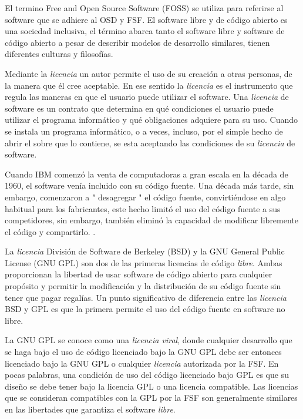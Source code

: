  	El termino Free and Open Source Software (FOSS) se utiliza para referirse al software que se adhiere al OSD y FSF. El software libre y de código
	abierto es una sociedad inclusiva, el término abarca tanto el software libre y software de código abierto a pesar de describir modelos de desarrollo
	similares, tienen diferentes culturas y filosofías.
	
	Mediante la \textit{licencia} un autor permite el uso de su creación a otras personas, de la manera que él cree aceptable. En ese sentido
	la \textit{licencia} es el instrumento que regula las maneras en que el usuario puede utilizar el software. Una \textit{licencia} de software es un
	contrato que determina en qué condiciones el usuario puede utilizar el programa informático y qué obligaciones adquiere para su uso. Cuando se
	instala un programa informático, o a veces, incluso, por el simple hecho de abrir el sobre que lo contiene, se esta aceptando las condiciones de su
	\textit{licencia} de software.
	
	Cuando IBM comenzó la venta de computadoras a gran escala en la década de 1960, el software venía incluido con su código fuente. Una década más
	tarde, sin embargo, comenzaron a " desagregar "  el código fuente, convirtiéndose en algo habitual para los fabricantes, este hecho limitó el uso del
	código fuente a sus competidores, sin embargo, también eliminó la capacidad de modificar libremente el código y compartirlo. \cite{Etiqueta08}.
	
	La \textit{licencia} División de Software de Berkeley (BSD) y la GNU General Public License (GNU GPL) son dos de las primeras licencias de código
	\textit{libre}. Ambas proporcionan la libertad de usar software de código abierto para cualquier propósito y permitir la modificación y la
	distribución de su código fuente sin tener que pagar regalías. Un punto significativo de diferencia entre las \textit{licencia} BSD y GPL es que la
	primera permite el uso del código fuente en software no libre.
	
	La GNU GPL se conoce como una \textit{licencia viral}, donde cualquier desarrollo que se haga bajo el uso de código licenciado bajo la GNU GPL debe
	ser entonces licenciado bajo la GNU GPL o cualquier \textit{licencia} autorizada por la FSF. En pocas palabras, una condición de uso del código
	licenciado bajo GPL es que su diseño se debe tener bajo la licencia  GPL o una licencia compatible. Las licencias que se consideran compatibles con
	la GPL por la FSF son generalmente similares en las libertades que garantiza el software \textit{libre}.
	
